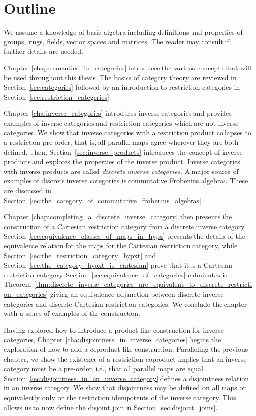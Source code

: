 \section{Outline} %
\label{sec:outline}

We assume a knowledge of basic algebra including definitions and properties of groups, rings,
fields, vector spaces and matrices. The reader may consult \cite{lang:algebra} if further details
are needed.

Chapter~\ref{chap:semantics_in_categories} introduces the various concepts that will be used
throughout this thesis. The basics of category theory are reviewed in Section~\ref{sec:categories}
followed by an introduction to restriction categories in
Section~\ref{sec:restriction_categories}.

Chapter~\ref{cha:inverse_categories} introduces inverse categories and provides examples of inverse
categories and restriction categories which are not inverse categories. We show that inverse categories with a restriction
product collapses to a restriction pre-order, that is, all parallel maps agree wherever they are
both defined. Then, Section~\ref{sec:inverse_products} introduces the concept of inverse products and
explores the properties of the inverse product. Inverse categories with
inverse products are called \emph{discrete inverse categories}. A major source of examples of discrete inverse
categories is commutative Frobenius algebras. These are discussed in
Section~\ref{sec:the_category_of_commutative_frobenius_algebras}.

Chapter~\ref{chap:completing_a_discrete_inverse_category} then presents the construction of a
Cartesian restriction category from a discrete inverse category.
Section~\ref{sec:equivalence_classes_of_maps_in_hypx} presents the details of the equivalence
relation for the maps for the Cartesian restriction category, while
Section~\ref{sec:the_restriction_category_hypxt} and
Section~\ref{sec:the_category_hypxt_is_cartesian} prove that it is a Cartesian restriction
category. Section~\ref{sec:equivalence_of_categories} culminates in
Theorem~\ref{thm:discrete_inverse_categories_are_equivalent_to_discrete_restriction_categories}
giving an equivalence adjunction between discrete inverse categories and discrete Cartesian
restriction categories. We conclude the chapter with a series of examples of the construction.

Having explored how to introduce a product-like construction for inverse categories,
Chapter~\ref{cha:disjointness_in_inverse_categories} begins the exploration of how to add a
coproduct-like construction. Paralleling the previous chapter, we show the existence of a restriction
coproduct implies that an inverse category must be a pre-order, i.e., that all parallel maps are
equal. Section~\ref{sec:disjointness_in_an_inverse_category} defines a disjointness relation in an inverse category. We show
that disjointness may be defined on all maps or equivalently only on the restriction idempotents of
the inverse category. This allows us to now define the disjoint join in
Section~\ref{sec:disjoint_joins}.

